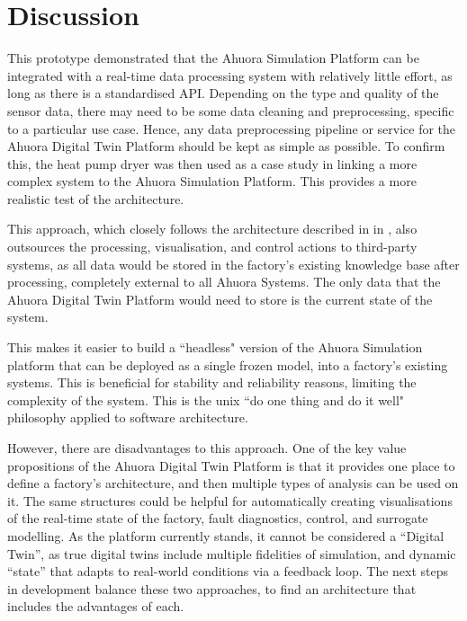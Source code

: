 \section{Discussion} \label{sec:prototypeinsights}

This prototype demonstrated that the Ahuora Simulation Platform can be integrated with a real-time data processing system with relatively little effort, as long as there is a standardised API. 
Depending on the type and quality of the sensor data, there may need to be some data cleaning and preprocessing, specific to a particular use case. 
Hence, any data preprocessing pipeline or service for the Ahuora Digital Twin Platform should be kept as simple as possible.
To confirm this, the heat pump dryer was then used as a case study in linking a more complex system to the Ahuora Simulation Platform. 
This provides a more realistic test of the architecture.

This approach, which closely follows the architecture described in  in , also outsources the processing, visualisation, and control actions to third-party systems, as all data would be stored in the factory's existing knowledge base after processing, completely external to all Ahuora Systems. The only data that the Ahuora Digital Twin Platform would need to store is the current state of the system. 

This makes it easier to build a ``headless" version of the Ahuora Simulation platform that can be deployed as a single frozen model, into a factory's existing systems. 
This is beneficial for stability and reliability reasons, limiting the complexity of the system. This is the unix ``do one thing and do it well" philosophy applied to software architecture.

However, there are disadvantages to this approach. 
One of the key value propositions of the Ahuora Digital Twin Platform is that it provides one place to define a factory's architecture, and then multiple types of analysis can be used on it. The same structures could be helpful for automatically creating visualisations of the real-time state of the factory, fault diagnostics, control, and surrogate modelling. 
As the platform currently stands, it cannot be considered a ``Digital Twin'', as true digital twins include multiple fidelities of simulation, and dynamic ``state'' that adapts to real-world conditions via a feedback loop. 
The next steps in development balance these two approaches, to find an architecture that includes the advantages of each.
